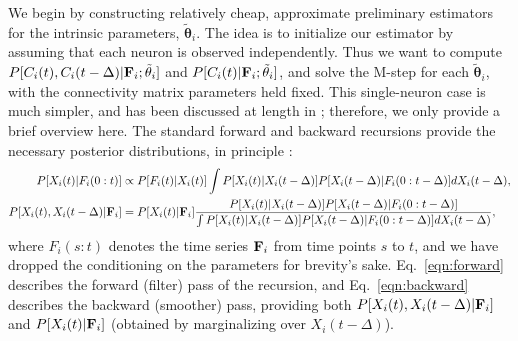 \documentclass[aoas,preprint]{imsart}
\newcommand{\bth}{\mathbf{\theta}}
\newcommand{\bF}{{\bf F}}
\newcommand{\tbth}{\tilde{\bth}}
\begin{document}
We begin by constructing relatively cheap, approximate preliminary
estimators for the intrinsic parameters, $\tbth_i$.  The idea is to
initialize our estimator by assuming that each neuron is observed
independently. Thus we want to compute $P[C_i(t), C_i(t-\Delta) |
\bF_i; \tbth_i]$ and $P[C_i(t)|\bF_i;\tbth_i]$, and solve the M-step
for each $\tbth_i$, with the connectivity matrix parameters held
fixed. This single-neuron case is much simpler, and has been discussed
at length in \cite{Vogelstein2009}; therefore, we only provide a brief
overview here. The standard forward and backward recursions provide
the necessary posterior distributions, in principle
\cite{ShumwayStoffer06}:
\begin{align}
P[X_i(t) | F_i(0:t)] &\propto P[F_i(t)| X_i(t)] \int P[X_i(t) |
    X_i(t-\Delta)] P[X_i(t-\Delta) | F_i(0:t-\Delta)] dX_i(t-\Delta),
\label{eqn:forward} \\
P[X_i(t), X_i(t-\Delta) | \bF_i] &= P[X_i(t) | \bF_i]
\frac{P[X_i(t) | X_i(t-\Delta)] P[X_i(t-\Delta) |
F_i(0:t-\Delta)]}{\int P[X_i(t) | X_i(t-\Delta)] P[X_i(t-\Delta) |
F_i(0:t-\Delta)] dX_i(t-\Delta)},
\label{eqn:backward}
\end{align}
where $F_i(s:t)$ denotes the time series $\bF_i$ from time points
$s$ to $t$, and we have dropped the conditioning on the parameters for
brevity's sake. Eq.~\eqref{eqn:forward} describes the forward (filter)
pass of the recursion, and Eq.~\eqref{eqn:backward} describes the
backward (smoother) pass, providing both $P[X_i(t), X_i(t-\Delta) |
\bF_i]$ and $P[X_i(t) | \bF_i]$ (obtained by marginalizing over
$X_i(t-\Delta)$).
\end{document}
